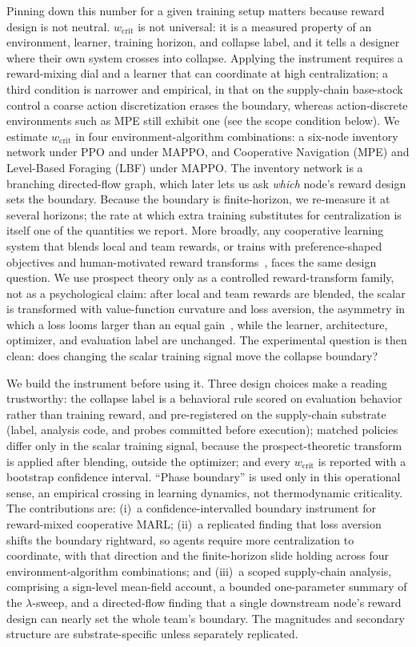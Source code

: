 \documentclass[letterpaper]{article} %
\theoremstyle{plain}
\newcommand{\wcrit}{w_{\mathrm{crit}}}
\begin{document}
Pinning down this number for a given training setup matters because reward design is not neutral.
$\wcrit$ is not universal: it is a measured property of an environment, learner, training horizon,
and collapse label, and it tells a designer where their own system crosses into collapse. Applying
the instrument requires a reward-mixing dial and a learner that can coordinate at high
centralization; a third condition is narrower and empirical, in that on the supply-chain base-stock
control a coarse action discretization erases the boundary, whereas action-discrete environments
such as MPE still exhibit one (see the scope condition below). We estimate $\wcrit$ in four
environment-algorithm combinations: a six-node inventory network under PPO and under MAPPO, and
Cooperative Navigation (MPE) and Level-Based Foraging (LBF) under MAPPO. The inventory network is a
branching directed-flow graph, which later lets us ask \emph{which} node's reward design sets the
boundary. Because the boundary is finite-horizon, we re-measure it at several horizons; the rate at which
extra training substitutes for centralization is itself one of the quantities we report. More broadly, any cooperative learning system that blends local and team rewards, or trains
with preference-shaped objectives and human-motivated reward
transforms~\citep{ethayarajh2024kto,lalmohammed2025}, faces the same design question. We use
prospect theory only as a controlled reward-transform family, not as a
psychological claim: after local and team rewards are blended, the scalar is transformed with
value-function curvature and loss aversion, the asymmetry in which a loss looms larger than an
equal gain~\citep{kahneman1979,tversky1992}, while the learner, architecture, optimizer, and
evaluation label are unchanged. The experimental question is then clean: does changing the scalar
training signal move the collapse boundary?

We build the instrument before using it. Three design choices make a reading trustworthy: the
collapse label is a behavioral rule scored on evaluation behavior rather than training reward, and
pre-registered on the supply-chain substrate (label, analysis code, and probes committed before
execution); matched policies differ only in the scalar training signal, because the
prospect-theoretic transform is applied after blending, outside the optimizer; and every $\wcrit$ is
reported with a bootstrap confidence interval. ``Phase boundary'' is used only in this operational sense, an empirical crossing in
learning dynamics, not thermodynamic criticality. The contributions are: (i)~a
confidence-intervalled boundary instrument for reward-mixed cooperative MARL; (ii)~a replicated
finding that loss aversion shifts the boundary rightward, so agents require more centralization to
coordinate, with that direction and the finite-horizon slide holding across four
environment-algorithm combinations; and (iii)~a scoped supply-chain analysis, comprising a
sign-level mean-field account, a bounded one-parameter summary of the $\lambda$-sweep, and a
directed-flow finding that a single downstream node's reward design can nearly set the whole team's
boundary. The magnitudes and secondary structure are substrate-specific unless separately
replicated.
\end{document}
